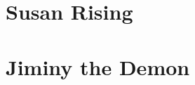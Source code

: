 \documentclass[12pt,twoside,onecolumn,openright,extrafontsizes]{memoir}
\begin{document}
\clearpage
\tableofcontents*

\mainmatter
\chapter{Susan Rising}

\chapter{Jiminy the Demon}


% 
\end{document}
